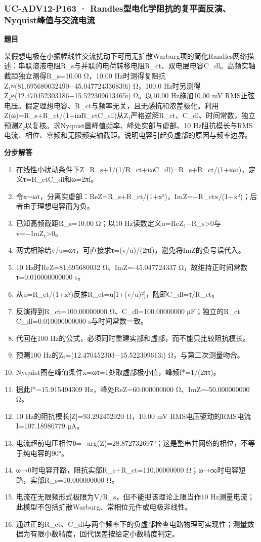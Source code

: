\documentclass[UTF8,11pt,a4paper]{ctexart}
\begin{document}
\subsubsection*{UC-ADV12-P163 · Randles型电化学阻抗的复平面反演、Nyquist峰值与交流电流}
\noindent\textbf{题目}\par
某假想电极在小振幅线性交流扰动下可用无扩散Warburg项的简化Randles网络描述：串联溶液电阻R\_s与并联的电荷转移电阻R\_ct、双电层电容C\_dl。高频实轴截距独立测得R\_s=10.00 Ω，10.00 Hz时测得复阻抗Z₁≈(81.695680032490−45.047724336839i) Ω，100.0 Hz时另测得Z₂≈(12.470452303186−15.522309613465i) Ω。以10.00 Hz施加10.00 mV RMS正弦电压。假定理想电容、R\_ct与频率无关，且无感抗和浓差极化。利用Z(ω)=R\_s+R\_ct/(1+iωR\_ctC\_dl)从Z₁严格逆解R\_ct、C\_dl、时间常数，独立预测Z₂以复核。求Nyquist圆峰值频率、峰处实部与虚部、10 Hz阻抗模长与RMS电流、相位、零频和无限频实轴截距。说明电容引起负虚部的原因与频率边界。\par
\medskip\noindent\textbf{分步解答}
\begin{enumerate}
\item 在线性小扰动条件下Z=R\_s+1/(1/R\_ct+iωC\_dl)=R\_s+R\_ct/(1+iωτ)，定义τ=R\_ctC\_dl和ω=2πf。
\item 令x=ωτ，分离实虚部：ReZ=R\_s+R\_ct/(1+x²)，ImZ=−R\_ctx/(1+x²)；后者由于理想电容而为负。
\item 已知高频截距R\_s=10.00 Ω；以10 Hz读数定义u=ReZ₁−R\_s>0与v=−ImZ₁>0。
\item 两式相除给v/u=ωτ，可直接求τ=(v/u)/(2πf)，避免将ImZ的负号误代入。
\item 10 Hz时ReZ=81.695680032 Ω、ImZ=-45.047724337 Ω，故维持正时间常数τ=0.010000000000 s。
\item 从u=R\_ct/(1+x²)反推R\_ct=u[1+(v/u)²]，随即C\_dl=τ/R\_ct。
\item 反演得到R\_ct=100.00000000 Ω、C\_dl=100.00000000 μF；独立的R\_ct C\_dl=0.010000000000 s与时间常数一致。
\item 代回在100 Hz的公式，必须同时重建实部和虚部，而不能只比较阻抗模长。
\item 预测100 Hz的Z₂=(12.470452303−15.522309613i) Ω，与第二次测量吻合。
\item Nyquist图在峰值条件x=ωτ=1处取虚部极小值，峰频f*=1/(2πτ)。
\item 据此f*=15.915494309 Hz，峰处ReZ=60.000000000 Ω、ImZ=-50.000000000 Ω。
\item 10 Hz的阻抗模长|Z|=93.292452020 Ω，10.00 mV RMS电压驱动的RMS电流I=107.18980779 μA。
\item 电流超前电压相位θ=−arg(Z)=28.872732697°；这是整串并网络的相位，不等于纯电容的90°。
\item ω→0时电容开路，阻抗实部R\_s+R\_ct=110.00000000 Ω；ω→∞时电容短路，实部R\_s=10.000000000 Ω。
\item 电流在无限频形式极限为V/R\_s，但不能把该理论上限当作10 Hz测量电流；此模型不包括扩散Warburg、常相位元件或电极非线性。
\item 通过正的R\_ct、C\_dl与两个频率下的负虚部检查电路物理可实现性；测量数据为有限小数精度，回代误差按给定小数精度判定。
\end{enumerate}
\end{document}
